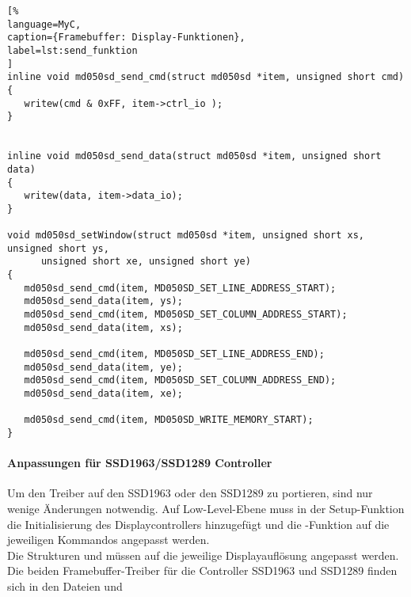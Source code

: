 \begin{lstlisting}[%
language=MyC,
caption={Framebuffer: Display-Funktionen},
label=lst:send_funktion
]
inline void md050sd_send_cmd(struct md050sd *item, unsigned short cmd)
{
   writew(cmd & 0xFF, item->ctrl_io );
}


inline void md050sd_send_data(struct md050sd *item, unsigned short data)
{
   writew(data, item->data_io);
}

void md050sd_setWindow(struct md050sd *item, unsigned short xs, unsigned short ys,
      unsigned short xe, unsigned short ye)
{
   md050sd_send_cmd(item, MD050SD_SET_LINE_ADDRESS_START);
   md050sd_send_data(item, ys);
   md050sd_send_cmd(item, MD050SD_SET_COLUMN_ADDRESS_START);
   md050sd_send_data(item, xs);

   md050sd_send_cmd(item, MD050SD_SET_LINE_ADDRESS_END);
   md050sd_send_data(item, ye);
   md050sd_send_cmd(item, MD050SD_SET_COLUMN_ADDRESS_END);
   md050sd_send_data(item, xe);

   md050sd_send_cmd(item, MD050SD_WRITE_MEMORY_START);
}
\end{lstlisting}
\newpage
\paragraph{Anpassungen für SSD1963/SSD1289 Controller}
Um den Treiber auf den SSD1963 oder den SSD1289 zu portieren, sind nur wenige Änderungen notwendig. Auf Low-Level-Ebene muss in der Setup-Funktion die Initialisierung des Displaycontrollers hinzugefügt und die -Funktion auf die jeweiligen Kommandos angepasst werden. \\
Die Strukturen  und  müssen auf die jeweilige Displayauflösung angepasst werden. Die beiden Framebuffer-Treiber für die Controller SSD1963 und SSD1289 finden sich in den Dateien  und 

